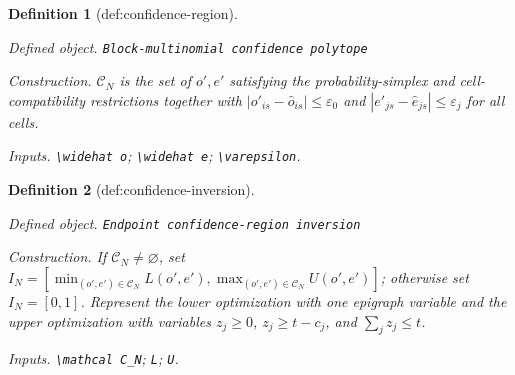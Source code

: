 \documentclass{article}
\newtheorem{definition}{Definition}
\begin{document}
\begin{definition}[def:confidence-region]\label{def:confidence-region}
\par\smallskip\noindent\emph{Defined object.} \texttt{Block-\allowbreak{}multinomial confidence polytope}
\par\smallskip\noindent\emph{Construction.} \(\mathcal C_N\) is the set of \(o',e'\) satisfying the probability-simplex and cell-compatibility restrictions together with \(|o'_{is}-\widehat o_{is}|\leq\varepsilon_0\) and \(|e'_{js}-\widehat e_{js}|\leq\varepsilon_j\) for all cells.
\par\smallskip\noindent\emph{Inputs.} \texttt{\textbackslash{}\allowbreak{}widehat o}; \texttt{\textbackslash{}\allowbreak{}widehat e}; \texttt{\textbackslash{}\allowbreak{}varepsilon}.
\end{definition}

\begin{definition}[def:confidence-inversion]\label{def:confidence-inversion}
\par\smallskip\noindent\emph{Defined object.} \texttt{Endpoint confidence-\allowbreak{}region inversion}
\par\smallskip\noindent\emph{Construction.} If \(\mathcal C_N\neq\varnothing\), set \(I_N=[\min_{(o',e')\in\mathcal C_N}L(o',e'),\max_{(o',e')\in\mathcal C_N}U(o',e')]\); otherwise set \(I_N=[0,1]\). Represent the lower optimization with one epigraph variable and the upper optimization with variables \(z_j\geq0\), \(z_j\geq t-c_j\), and \(\sum_jz_j\leq t\).
\par\smallskip\noindent\emph{Inputs.} \texttt{\textbackslash{}\allowbreak{}mathcal C\_\allowbreak{}N}; \texttt{L}; \texttt{U}.
\end{definition}
\end{document}
